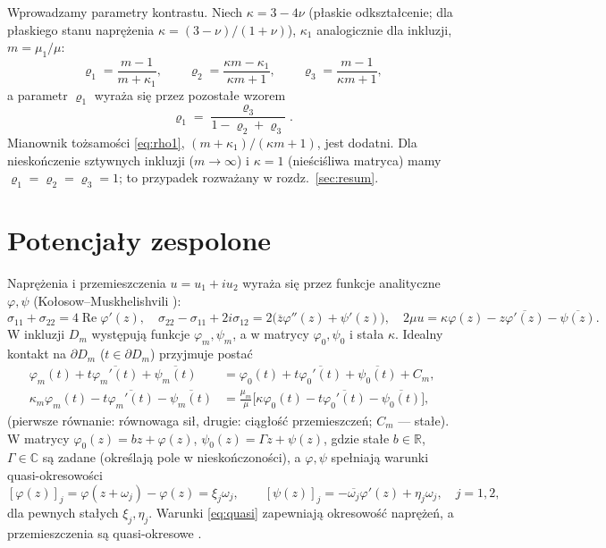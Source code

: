 \documentclass[12pt,a4paper,twoside,openright]{report}
\theoremstyle{definition}
\theoremstyle{remark}
\newcommand{\R}{\mathbb{R}}
\newcommand{\C}{\mathbb{C}}
\newcommand{\cc}[1]{\overline{#1}}
\renewcommand{\Re}{\operatorname{Re}}
\begin{document}
Wprowadzamy parametry kontrastu. Niech $\kappa=3-4\nu$ (płaskie odkształcenie; dla płaskiego stanu naprężenia $\kappa=(3-\nu)/(1+\nu)$), $\kappa_1$ analogicznie dla inkluzji, $m=\mu_1/\mu$:
\begin{equation}\label{eq:rho}
{\varrho_1=\frac{m-1}{m+\kappa_1},\qquad
\varrho_2=\frac{\kappa m-\kappa_1}{\kappa m+1},\qquad
\varrho_3=\frac{m-1}{\kappa m+1},}
\end{equation}
a parametr $\varrho_1$ wyraża się przez pozostałe wzorem
\begin{equation}\label{eq:rho1}
{\varrho_1=\frac{\varrho_3}{1-\varrho_2+\varrho_3}.}
\end{equation}
Mianownik tożsamości \eqref{eq:rho1}, $(m+\kappa_1)/(\kappa m+1)$, jest dodatni. Dla nieskończenie sztywnych inkluzji ($m\to\infty$) i $\kappa=1$ (nieściśliwa matryca) mamy $\varrho_1=\varrho_2=\varrho_3=1$; to przypadek rozważany w rozdz.~\ref{sec:resum}.

\section{Potencjały zespolone}

Naprężenia i przemieszczenia $u=u_1+iu_2$ wyraża się przez funkcje analityczne $\varphi,\psi$ (Kołosow--Muskhelishvili \cite{muskhelishvili1953some}):
\begin{equation}\label{eq:KM}
\sigma_{11}+\sigma_{22}=4\Re\varphi'(z),\quad
\sigma_{22}-\sigma_{11}+2i\sigma_{12}=2\bigl(\cc z\varphi''(z)+\psi'(z)\bigr),\quad
2\mu u=\kappa\varphi(z)-z\cc{\varphi'(z)}-\cc{\psi(z)}.
\end{equation}
W inkluzji $D_m$ występują funkcje $\varphi_m,\psi_m$, a w matrycy $\varphi_0,\psi_0$ i stała $\kappa$. Idealny kontakt na $\partial D_m$ ($t\in\partial D_m$) przyjmuje postać
\begin{align}
\varphi_m(t)+t\cc{\varphi_m'(t)}+\cc{\psi_m(t)}&=\varphi_0(t)+t\cc{\varphi_0'(t)}+\cc{\psi_0(t)}+C_m,\\
\kappa_m\varphi_m(t)-t\cc{\varphi_m'(t)}-\cc{\psi_m(t)}&=\frac{\mu_m}{\mu}\bigl[\kappa\varphi_0(t)-t\cc{\varphi_0'(t)}-\cc{\psi_0(t)}\bigr],
\end{align}
(pierwsze równanie: równowaga sił, drugie: ciągłość przemieszczeń; $C_m$ --- stałe). W matrycy $\varphi_0(z)=bz+\varphi(z)$, $\psi_0(z)=\Gamma z+\psi(z)$, gdzie stałe $b\in\R$, $\Gamma\in\C$ są zadane (określają pole w nieskończoności), a $\varphi,\psi$ spełniają warunki quasi-okresowości
\begin{equation}\label{eq:quasi}
[\varphi(z)]_j=\varphi(z+\omega_j)-\varphi(z)=\xi_j\omega_j,\qquad
[\psi(z)]_j=-\cc{\omega_j}\varphi'(z)+\eta_j\omega_j,\quad j=1,2,
\end{equation}
dla pewnych stałych $\xi_j,\eta_j$. Warunki \eqref{eq:quasi} zapewniają okresowość naprężeń, a przemieszczenia są quasi-okresowe \cite{grigolyuk1992periodic}.
\end{document}
